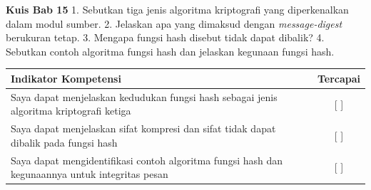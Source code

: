 \begin{obeassessment}
\textbf{Kuis Bab 15}
1. Sebutkan tiga jenis algoritma kriptografi yang diperkenalkan dalam modul
   sumber.
2. Jelaskan apa yang dimaksud dengan \textit{message-digest} berukuran tetap.
3. Mengapa fungsi hash disebut tidak dapat dibalik?
4. Sebutkan contoh algoritma fungsi hash dan jelaskan kegunaan fungsi hash.
\end{obeassessment}
\begin{competencychecklist}
\begin{tabularx}{\linewidth}{|X|c|}
\hline
Indikator Kompetensi & Tercapai \\
\hline
Saya dapat menjelaskan kedudukan fungsi hash sebagai jenis algoritma kriptografi
ketiga & [ ] \\
\hline
Saya dapat menjelaskan sifat kompresi dan sifat tidak dapat dibalik pada fungsi
hash & [ ] \\
\hline
Saya dapat mengidentifikasi contoh algoritma fungsi hash dan kegunaannya untuk
integritas pesan & [ ] \\
\hline
\end{tabularx}
\end{competencychecklist}
